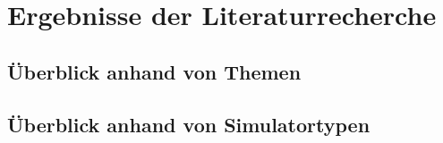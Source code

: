 \chapter{Ergebnisse der Literaturrecherche}\label{results}

\section{Überblick anhand von Themen}\label{chap_4_2}

\section{Überblick anhand von Simulatortypen}
